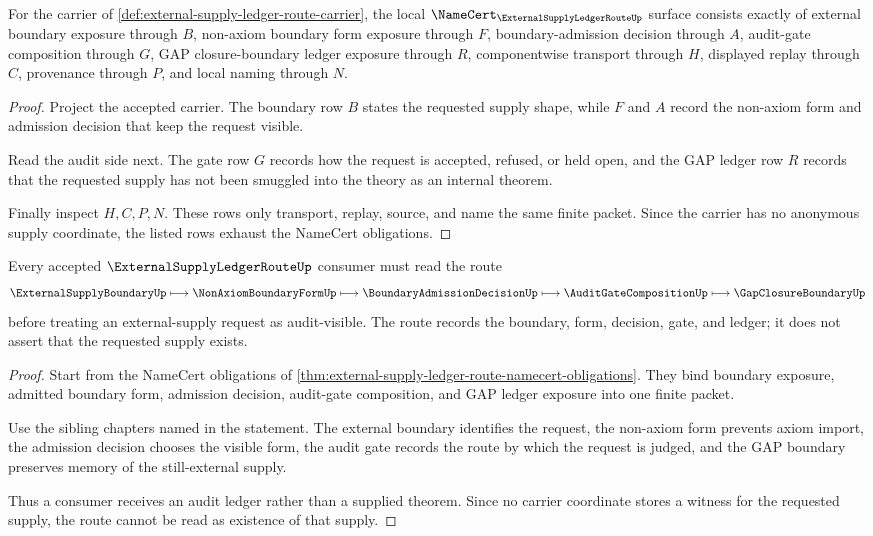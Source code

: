 \begin{theorem}
\label{thm:external-supply-ledger-route-namecert-obligations}
For the carrier of \autoref{def:external-supply-ledger-route-carrier}, the local $\NameCert_{\ExternalSupplyLedgerRouteUp}$ surface consists exactly of external boundary exposure through $B$, non-axiom boundary form exposure through $F$, boundary-admission decision through $A$, audit-gate composition through $G$, GAP closure-boundary ledger exposure through $R$, componentwise transport through $H$, displayed replay through $C$, provenance through $P$, and local naming through $N$.
\end{theorem}
\begin{proof}
Project the accepted carrier. The boundary row $B$ states the requested supply shape, while $F$ and $A$ record the non-axiom form and admission decision that keep the request visible.

Read the audit side next. The gate row $G$ records how the request is accepted, refused, or held open, and the GAP ledger row $R$ records that the requested supply has not been smuggled into the theory as an internal theorem.

Finally inspect $H,C,P,N$. These rows only transport, replay, source, and name the same finite packet. Since the carrier has no anonymous supply coordinate, the listed rows exhaust the NameCert obligations.
\end{proof}

\begin{theorem}
\label{thm:external-supply-ledger-route-nonaxiom-boundary}
Every accepted $\ExternalSupplyLedgerRouteUp$ consumer must read the route
$$
\ExternalSupplyBoundaryUp \longmapsto \NonAxiomBoundaryFormUp \longmapsto \BoundaryAdmissionDecisionUp \longmapsto \AuditGateCompositionUp \longmapsto \GapClosureBoundaryUp
$$
before treating an external-supply request as audit-visible. The route records the boundary, form, decision, gate, and ledger; it does not assert that the requested supply exists.
\end{theorem}
\begin{proof}
Start from the NameCert obligations of \autoref{thm:external-supply-ledger-route-namecert-obligations}. They bind boundary exposure, admitted boundary form, admission decision, audit-gate composition, and GAP ledger exposure into one finite packet.

Use the sibling chapters named in the statement. The external boundary identifies the request, the non-axiom form prevents axiom import, the admission decision chooses the visible form, the audit gate records the route by which the request is judged, and the GAP boundary preserves memory of the still-external supply.

Thus a consumer receives an audit ledger rather than a supplied theorem. Since no carrier coordinate stores a witness for the requested supply, the route cannot be read as existence of that supply.
\end{proof}

